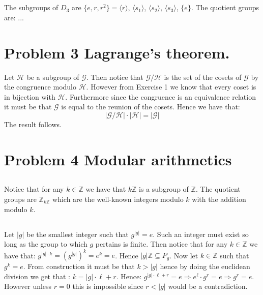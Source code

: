 \documentclass[10pt,a4paper]{book}
\begin{document}
\subsection{}
The subgroups of $D_3$ are $\{e, r, r^2\} = \langle r \rangle$, $\langle s_1 \rangle$, $\langle s_2 \rangle$, $\langle s_3 \rangle$, $\{e\}$. The quotient groups are: ...

\section{Problem 3 Lagrange's theorem.}
Let $\mathcal{H}$ be a subgroup of $\mathcal{G}$. Then notice that $\mathcal{G} / \mathcal{H}$ is the set of the cosets of $\mathcal{G}$ by the congruence modulo $\mathcal{H}$. However from Exercise 1 we know that every coset is in bijection with $\mathcal{H}$. Furthermore since the congruence is an equivalence relation it must be that $\mathcal{G}$ is equal to the reunion of the cosets. Hence we have that:
\[
|\mathcal{G} / \mathcal{H} | \cdot |\mathcal{H} | = | \mathcal{G} | 
\]
The result follows.

\section{Problem 4 Modular arithmetics}
\subsection{}
Notice that for any $k \in \mathbb{Z}$ we have that $k\mathbb{Z}$ is a subgroup of $\mathbb{Z}$. The quotient groups are $\mathbb{Z}_{k\mathbb{Z}}$ which are the well-known integers modulo $k$ with the addition modulo $k$.

\subsection{}
Let $|g|$ be the smallest integer such that $g^{|g|} = e$. Such an integer must exist so long as the group to which $g$ pertains is finite. Then notice that for any $k \in \mathbb{Z}$ we have that: $g^{|g|\cdot k} = (g^{|g|})^{k} = e^k = e$. Hence $|g|\mathbb{Z} \subseteq P_g$. Now let $k \in \mathbb{Z}$ such that $g^k = e$. From construction it must be that $k > |g|$ hence by doing the euclidean division we get that : $k = |g|\cdot \ell + r$. Hence: $g^{|g| \cdot \ell + r} = e \Rightarrow e^\ell \cdot g^r = e \Rightarrow g^r = e$. However unless $r = 0$ this is impossible since $r < |g|$ would be a contradiction.
\end{document}
